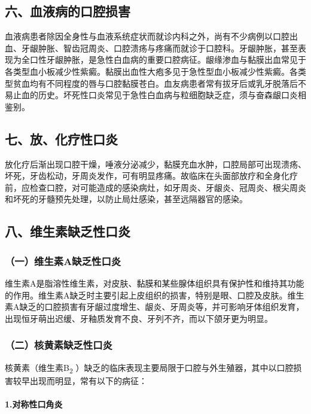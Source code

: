 \subsection{六、血液病的口腔损害}

血液病患者除因全身性与血液系统症状而就诊内科之外，尚有不少病例以口腔出血、牙龈肿胀、智齿冠周炎、口腔溃疡与疼痛而就诊于口腔科。牙龈肿胀，甚至表现为全口性牙龈肿胀，是急性白血病的重要口腔病征。龈缘渗血与黏膜出血常见于各类型血小板减少性紫癜。黏膜出血性大疱多见于急性型血小板减少性紫癜。各类型贫血均有不同程度的唇与口腔黏膜苍白。血友病患者常有拔牙后或乳牙脱落后不易止血的历史。坏死性口炎常见于急性白血病与粒细胞缺乏症，须与奋森龈口炎相鉴别。

\subsection{七、放、化疗性口炎}

放化疗后渐出现口腔干燥，唾液分泌减少，黏膜充血水肿，口腔局部可出现溃疡、坏死，牙齿松动，牙周炎发作，可有明显疼痛。故临床在头面部放疗和全身化疗前，应检查口腔，对可能造成的感染病灶，如牙周炎、牙龈炎、冠周炎、根尖周炎和坏死的牙髓预先处理，以防止局灶感染，甚至远隔器官的感染。

\subsection{八、维生素缺乏性口炎}

\subsubsection{（一）维生素A缺乏性口炎}

维生素A是脂溶性维生素，对皮肤、黏膜和某些腺体组织具有保护性和维持其功能的作用。维生素A缺乏时主要引起上皮组织的损害，特别是眼、口腔及皮肤。维生素A缺乏的口腔损害有牙龈过度增生、龈炎、牙周炎等，并可影响牙体组织发育，出现恒牙萌出迟缓、牙釉质发育不良、牙列不齐，而以下颌牙更为明显。

\subsubsection{（二）核黄素缺乏性口炎}

核黄素（维生素B\textsubscript{2}
）缺乏的临床表现主要局限于口腔与外生殖器，其中以口腔损害较早出现而明显，常有以下的病征：

\paragraph{1.对称性口角炎}

